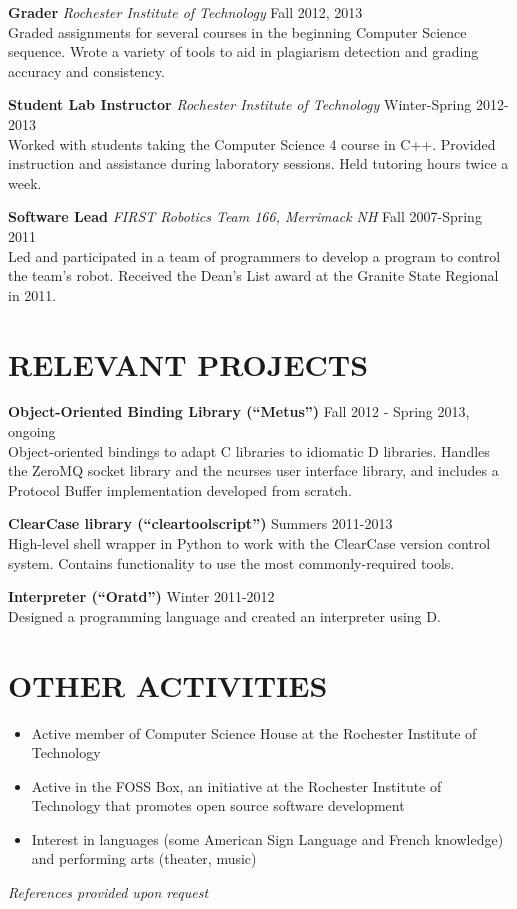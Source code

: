 \documentclass[line]{res}
\begin{document}
\begin{resume}
	\textbf{Grader}
	\textit{Rochester Institute of Technology}
	\hfill
	Fall 2012, 2013\\
	Graded assignments for several courses in the beginning Computer Science sequence.
	Wrote a variety of tools to aid in plagiarism detection and grading accuracy and consistency.

	\textbf{Student Lab Instructor}
	\textit{Rochester Institute of Technology}
	\hfill
	Winter-Spring 2012-2013\\
	Worked with students taking the Computer Science 4 course in C++.
	Provided instruction and assistance during laboratory sessions.
	Held tutoring hours twice a week.

	\textbf{Software Lead}
	\textit{FIRST Robotics Team 166, Merrimack NH}
	\hfill
	Fall 2007-Spring 2011\\
	Led and participated in a team of programmers to develop a program to control the team's robot.
	Received the Dean's List award at the Granite State Regional in 2011.

\section{RELEVANT PROJECTS}

	\textbf{Object-Oriented Binding Library (``Metus'')}
	\hfill
	Fall 2012 - Spring 2013, ongoing
	\\
	Object-oriented bindings to adapt C libraries to idiomatic D libraries. Handles the ZeroMQ  socket library and the ncurses user interface library, and includes a Protocol Buffer implementation developed from scratch.
	
	\textbf{ClearCase library (``cleartoolscript'')}
	\hfill
	Summers 2011-2013
	\\
	High-level shell wrapper in Python to work with the ClearCase version control system. Contains functionality to use the most commonly-required tools.
	
	\textbf{Interpreter (``Oratd'')}
	\hfill
	Winter 2011-2012
	\\
	Designed a programming language and created an interpreter using D.%

\section{OTHER ACTIVITIES}
	\begin{itemize}[leftmargin=10pt]
	\item Active member of Computer Science House at the Rochester Institute of Technology
	\item Active in the FOSS Box, an initiative at the Rochester Institute of Technology that promotes open source software development
	\item Interest in languages (some American Sign Language and French knowledge) and performing arts (theater, music)
	\end{itemize}

\begin{center}
\vspace{-0.26in}
\emph{References provided upon request\\[8pt]}
\end{center}

\end{resume}
\end{document}
